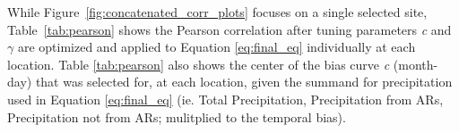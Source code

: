 \documentclass[12pts,draft]{AR_analysis_}
\begin{document}


While Figure~\ref{fig:concatenated_corr_plots} focuses on a single
selected site, Table~\ref{tab:pearson} shows the Pearson correlation after
tuning parameters \emph{c} and $\gamma$ are optimized and applied to 
Equation 
\ref{eq:final_eq} individually at each location.
Table \ref{tab:pearson} also shows the center of the bias curve \emph{c} 
(month-day)
that was selected for, at each location, given the summand for 
precipitation used in
Equation \ref{eq:final_eq} (ie. Total Precipitation, Precipitation from ARs, 
Precipitation not from ARs; mulitplied to the temporal bias).  


\end{document}
